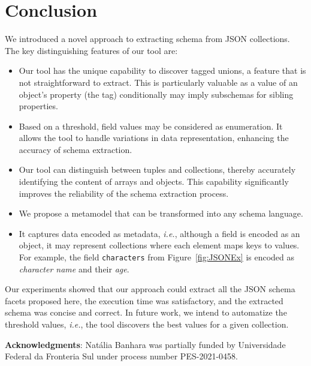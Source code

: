 \section{Conclusion}
\label{sec:Concl}

We introduced a novel approach to extracting schema from JSON collections. The key distinguishing features of our tool are:

\begin{itemize}
    \item Our tool has the unique capability to discover tagged unions, a feature that is not straightforward to extract. This is particularly valuable as a value of an object's property (the tag) conditionally may imply subschemas for sibling properties.
    \item Based on a threshold, field values may be considered as enumeration. It allows the tool to handle variations in data representation, enhancing the accuracy of schema extraction.
    \item Our tool can distinguish between tuples and collections, thereby accurately identifying the content of arrays and objects. This capability significantly improves the reliability of the schema extraction process.
    \item We propose a metamodel that can be transformed into any schema language.
    \item It captures data encoded as metadata, \textit{i.e.}, although a field is encoded as an object, it may represent collections where each element maps keys to values. For example, the field \texttt{characters} from Figure~\ref{fig:JSONEx} is encoded as \textit{character name} and their \textit{age}.
\end{itemize}

Our experiments showed that our approach could extract all the JSON schema facets proposed here, the execution time was satisfactory, and the extracted schema was concise and correct. In future work, we intend to automatize the threshold values, \textit{i.e.}, the tool discovers the best values for a given collection.  

\noindent
\textbf{Acknowledgments}: Natália Banhara was partially funded by Universidade Federal da Fronteria Sul under process number PES-2021-0458.
